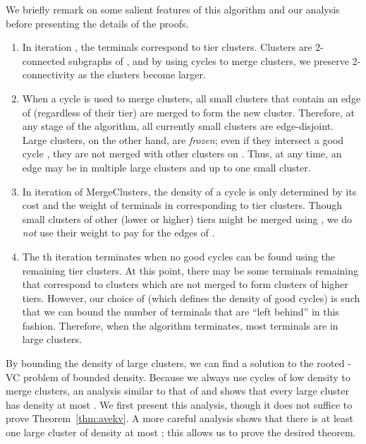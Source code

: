 \documentclass[11pt]{article}
\newcommand{\kvc}[1]{-{\sc VC} }
\newcommand{\kv}{\kvc{2}}
\begin{document}
We briefly remark on some salient features of this algorithm and our
analysis before presenting the details of the proofs.
\begin{enumerate}
\item In iteration , the terminals correspond to tier 
  clusters. Clusters are 2-connected subgraphs of , and by using
  cycles to merge clusters, we preserve 2-connectivity as the clusters
  become larger.

\item When a cycle  is used to merge clusters, all small clusters
  that contain an edge of  (regardless of their tier) are merged to
  form the new cluster. Therefore, at any stage of the algorithm, all
  currently small clusters are edge-disjoint.  Large clusters, on the
  other hand, are \emph{frozen}; even if they intersect a good cycle
  , they are not merged with other clusters on . Thus, at any
  time, an edge may be in multiple large clusters and up to one small
  cluster.

\item In iteration  of {\sc MergeClusters}, the density of a cycle
   is only determined by its cost and the weight of terminals in
   corresponding to tier  clusters. Though small clusters of
  other (lower or higher) tiers might be merged using , we do
  \emph{not} use their weight to pay for the edges of .

\item The th iteration terminates when no good cycles can be found
  using the remaining tier  clusters. At this point, there may be
  some terminals remaining that correspond to clusters which are not
  merged to form clusters of higher tiers. However, our choice of
   (which defines the density of good cycles) is such that we
  can bound the number of terminals that are ``left behind'' in this
  fashion. Therefore, when the algorithm terminates, most terminals
  are in large clusters.
\end{enumerate}

By bounding the density of large clusters, we can find a solution to
the rooted \kv problem of bounded density. Because we always use
cycles of low density to merge clusters, an analysis similar to that
of \cite{LauNSS07} and \cite{ChekuriKP08} shows that every large
cluster has density at most . We first present this
analysis, though it does not suffice to prove Theorem~\ref{thm:avekv}.
A more careful analysis shows that there is at least one large cluster
of density at most ; this allows us to prove the
desired theorem.
\end{document}
